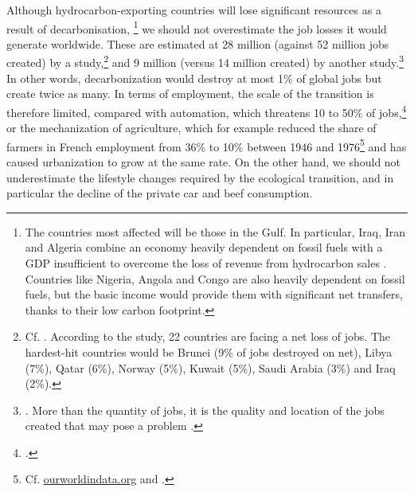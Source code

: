 \documentclass[a5paper,english,openany]{memoir}
\begin{document}
Although hydrocarbon-exporting countries will lose significant resources as a result of decarbonisation, %
\footnote{The countries most affected will be those in the Gulf. In particular, Iraq, Iran and Algeria combine an economy heavily dependent on fossil fuels with a GDP insufficient to overcome the loss of revenue from hydrocarbon sales \citep{muttitt_equity_2020}. Countries like Nigeria, Angola and Congo are also heavily dependent on fossil fuels, but the basic income would provide them with significant net transfers, thanks to their low carbon footprint.} we should not overestimate the job losses it would generate worldwide. These are estimated at 28 million (against 52 million jobs created) by a study,\footnote{Cf. \cite{jacobson_100_2017}. According to the study, 22 countries are facing a net loss of jobs. The hardest-hit countries would be Brunei (9\% of jobs destroyed on net), Libya (7\%), Qatar (6\%), Norway (5\%), Kuwait (5\%), Saudi Arabia (3\%) and Iraq (2\%).} and 9 million (versus 14 million created) by another study.\footnote{\cite{pai_meeting_2021}. More than the quantity of jobs, it is the quality and location of the jobs created that may pose a problem \citep{haywood_welfare_2021}.} In other words, decarbonization %
would destroy at most 1\% of global jobs but %
create twice as many. In terms of employment, the scale of the transition is therefore limited, compared with automation, which threatens 10 to 50\% of jobs,\footnote{\cite{frey_future_2017,lassebie_what_2022,hatzius_global_2023}.} or the mechanization of agriculture, which for example reduced the share of farmers in French employment from 36\% to 10\% between 1946 and 1976\footnote{Cf. \href{https://ourworldindata.org/grapher/urbanization-last-500-years?country=~FRA}{ourworldindata.org} and \href{https://ourworldindata.org/grapher/share-of-the-labor-force-employed-in-agriculture?tab=chart&time=1800..latest&country=FRA}{\cite{herrendorf_chapter_2014}}.} and has caused urbanization %
to grow at the same rate. On the other hand, we should not underestimate the lifestyle changes required by the ecological transition, %
and in particular the decline of the private car and beef consumption.
\end{document}
